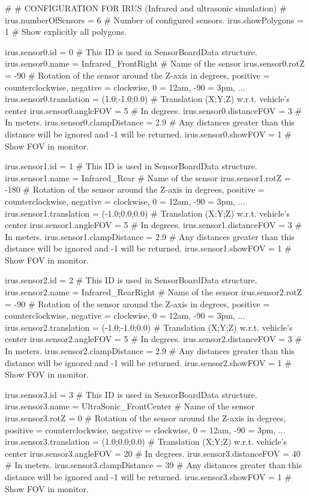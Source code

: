 #
# CONFIGURATION FOR IRUS (Infrared and ultrasonic simulation)
#
irus.numberOfSensors = 6                   # Number of configured sensors.
irus.showPolygons = 1                      # Show explicitly all polygons.

irus.sensor0.id = 0                        # This ID is used in SensorBoardData structure.
irus.sensor0.name = Infrared_FrontRight    # Name of the sensor
irus.sensor0.rotZ = -90                    # Rotation of the sensor around the Z-axis in degrees, positive = counterclockwise, negative = clockwise, 0 = 12am, -90 = 3pm, ...
irus.sensor0.translation = (1.0;-1.0;0.0)  # Translation (X;Y;Z) w.r.t. vehicle's center
irus.sensor0.angleFOV = 5                  # In degrees.
irus.sensor0.distanceFOV = 3               # In meters.
irus.sensor0.clampDistance = 2.9           # Any distances greater than this distance will be ignored and -1 will be returned.
irus.sensor0.showFOV = 1                   # Show FOV in monitor.

irus.sensor1.id = 1                        # This ID is used in SensorBoardData structure.
irus.sensor1.name = Infrared_Rear          # Name of the sensor
irus.sensor1.rotZ = -180                   # Rotation of the sensor around the Z-axis in degrees, positive = counterclockwise, negative = clockwise, 0 = 12am, -90 = 3pm, ...
irus.sensor1.translation = (-1.0;0.0;0.0)  # Translation (X;Y;Z) w.r.t. vehicle's center
irus.sensor1.angleFOV = 5                  # In degrees.
irus.sensor1.distanceFOV = 3               # In meters.
irus.sensor1.clampDistance = 2.9           # Any distances greater than this distance will be ignored and -1 will be returned.
irus.sensor1.showFOV = 1                   # Show FOV in monitor.

irus.sensor2.id = 2                        # This ID is used in SensorBoardData structure.
irus.sensor2.name = Infrared_RearRight     # Name of the sensor
irus.sensor2.rotZ = -90                    # Rotation of the sensor around the Z-axis in degrees, positive = counterclockwise, negative = clockwise, 0 = 12am, -90 = 3pm, ...
irus.sensor2.translation = (-1.0;-1.0;0.0) # Translation (X;Y;Z) w.r.t. vehicle's center
irus.sensor2.angleFOV = 5                  # In degrees.
irus.sensor2.distanceFOV = 3               # In meters.
irus.sensor2.clampDistance = 2.9           # Any distances greater than this distance will be ignored and -1 will be returned.
irus.sensor2.showFOV = 1                   # Show FOV in monitor.

irus.sensor3.id = 3                        # This ID is used in SensorBoardData structure.
irus.sensor3.name = UltraSonic_FrontCenter # Name of the sensor
irus.sensor3.rotZ = 0                      # Rotation of the sensor around the Z-axis in degrees, positive = counterclockwise, negative = clockwise, 0 = 12am, -90 = 3pm, ...
irus.sensor3.translation = (1.0;0.0;0.0)   # Translation (X;Y;Z) w.r.t. vehicle's center
irus.sensor3.angleFOV = 20                 # In degrees.
irus.sensor3.distanceFOV = 40              # In meters.
irus.sensor3.clampDistance = 39            # Any distances greater than this distance will be ignored and -1 will be returned.
irus.sensor3.showFOV = 1                   # Show FOV in monitor.

